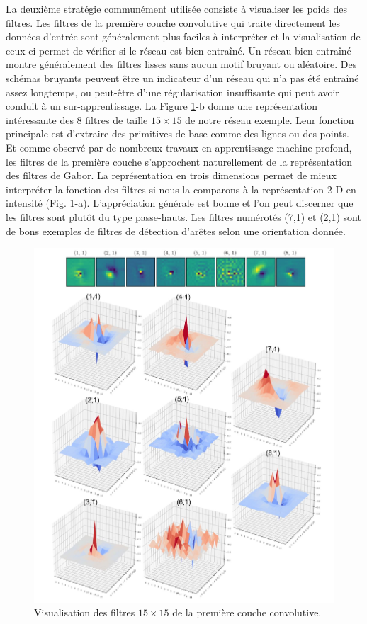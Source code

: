 La deuxième stratégie communément utilisée consiste à visualiser les poids des filtres. Les filtres de la première couche convolutive qui traite directement les données d'entrée sont généralement plus faciles à interpréter et la visualisation de ceux-ci permet de vérifier si le réseau est bien entraîné. Un réseau bien entraîné montre généralement des filtres lisses sans aucun motif bruyant ou aléatoire. Des schémas bruyants peuvent être un indicateur d'un réseau qui n'a pas été entraîné assez longtemps, ou peut-être d'une régularisation insuffisante qui peut avoir conduit à un sur-apprentissage. La Figure \ref{fig:filter_viz}-b donne une représentation intéressante des 8 filtres de taille $15\times15$ de notre réseau exemple. Leur fonction principale est d'extraire des primitives de base comme des lignes ou des points.  Et comme observé par de nombreux travaux en apprentissage machine profond, les filtres de la première couche s'approchent naturellement de la représentation des filtres de Gabor. La représentation en trois dimensions permet de mieux interpréter la fonction des filtres si nous la comparons à la représentation 2-D en intensité (Fig. \ref{fig:filter_viz}-a). L'appréciation générale est bonne et l'on peut discerner que les filtres sont plutôt du type passe-hauts. Les filtres numérotés (7,1) et (2,1) sont de bons exemples de filtres de détection d'arêtes selon une orientation donnée. 
\begin{figure}[!htbp] 
\includegraphics[width=1.1\textwidth]{figures/Chap4/results/analyse_model/activation/filter_viz.jpg}
 \centering
  \caption{
  \small{ Visualisation des filtres $15 \times 15$ de la première couche convolutive.
  }}
  \label{fig:filter_viz}
\end{figure}

